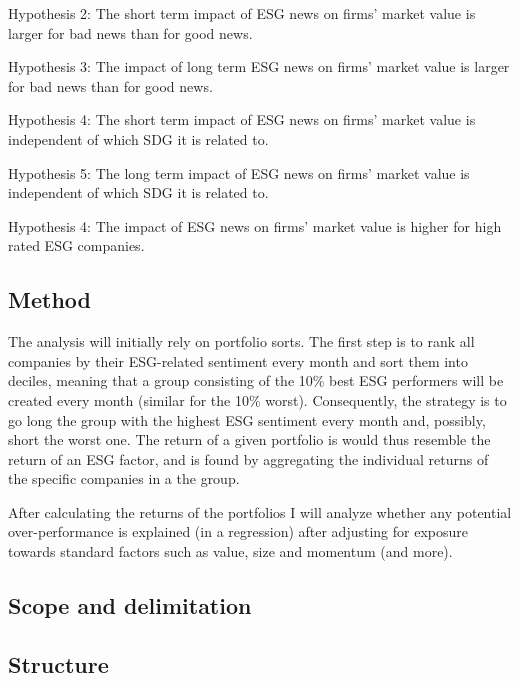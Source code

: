 Hypothesis 2:
The short term impact of ESG news on firms' market value is larger for bad news than for good news. 

Hypothesis 3:
The impact of long term ESG news on firms' market value is larger for bad news than for good news. 

Hypothesis 4: The short term impact of ESG news on firms' market value is independent of which SDG it is related to. 

Hypothesis 5: The long term impact of ESG news on firms' market value is independent of which SDG it is related to.  

Hypothesis 4: The impact of ESG news on firms' market value is higher for high rated ESG companies. 

\subsection{Method}

The analysis will initially rely on portfolio sorts. The first step is to rank all companies by their ESG-related sentiment every month and sort them into deciles, meaning that a group consisting of the 10\% best ESG performers will be created every month (similar for the 10\% worst). Consequently, the strategy is to go long the group with the highest ESG sentiment every month and, possibly, short the worst one. The return of a given portfolio is would thus resemble the return of an ESG factor, and is found by aggregating the individual returns of the specific companies in a the group.  

After calculating the returns of the portfolios I will analyze whether any potential over-performance is explained (in a regression) after adjusting for exposure towards standard factors such as value, size and momentum (and more).
\subsection{Scope and delimitation}

\subsection{Structure}
